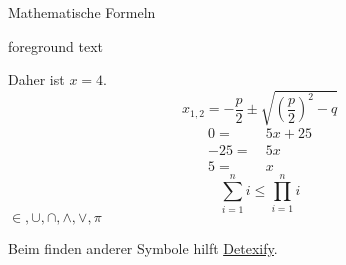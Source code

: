 \documentclass[aspectratio=169]{beamer}
\newcommand\citestyle[1]{\textcolor{foreground-secondary}{\textsuperscript{#1}}}
\let\oldautocite\autocite
\renewcommand{\autocite}[1]{\citestyle{\oldautocite{#1}}}
\begin{document}
\begin{frame}[fragile]{Mathematische Formeln}
\begin{minipage}{0.66\textwidth}
    \end{minipage}\begin{minipage}{0.33\textwidth}

    \bgroup 
        \begin{OutputBox}
        \begin{beamercolorbox}{foreground text}
            \selectfont%

    Daher ist \(x=4\). %
    \[
        x_{1,2} = -\frac{p}{2}\pm
        \sqrt{\left(\frac{p}{2}\right)^2-q}
    \] %
    \begin{align*}
        0 =&\ 5x + 25 \tag{$-25$} \\
        -25 =&\ 5x \tag{$/-5$} \\
        5 =&\ x
    \end{align*}
    $$ \sum\limits_{i=1}^n i 
       \leq \prod\limits_{i=1}^n i $$
    $\in, \cup, \cap, \land, \lor, \pi$

            \end{beamercolorbox}
        \end{OutputBox}
    \egroup

    \end{minipage}

    Beim finden anderer Symbole hilft
    \href{https://detexify.kirelabs.org/classify.html}{\alert{\underline{Detexify}}}.\autocite{detexify}
    \end{frame}
\end{document}
